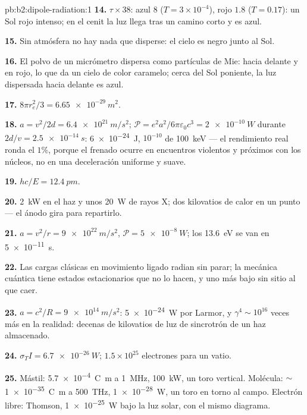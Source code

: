 \begin{solution}{pb:b2:dipole-radiation:1}
\textbf{14.} $\tau \times 38$: azul $8$ ($T = 3 \times 10^{-4}$), rojo $1.8$ ($T = 0.17$): un Sol
rojo intenso; en el cenit la luz llega tras un camino corto y es azul.

\textbf{15.} Sin atmósfera no hay nada que disperse: el cielo es negro junto
al Sol.

\textbf{16.} El polvo de un micrómetro dispersa como partículas de Mie: hacia delante y
en rojo, lo que da un cielo de color caramelo; cerca del Sol poniente, la
luz dispersada hacia delante es azul.

\textbf{17.} $8\pi r_e^2/3 = \qty{6.65e-29}{m^2}$.

\textbf{18.} $a = v^2/2d = \qty{6.4e21}{m/s^2}$; $\mathcal P = e^2a^2/6\pi\varepsilon_0c^3 =
\qty{2e-10}{W}$ durante $2d/v = \qty{2.5e-14}{s}$: \qty{6e-24}{J}, $10^{-10}$ de
\qty{100}{keV} --- el rendimiento real ronda el $1\%$, porque el frenado ocurre
en encuentros violentos y próximos con los núcleos, no en una deceleración
uniforme y suave.

\textbf{19.} $hc/E = \qty{12.4}{pm}$.

\textbf{20.} \qty{2}{kW} en el haz y unos \qty{20}{W} de rayos X; dos kilovatios
de calor en un punto --- el ánodo gira para repartirlo.

\textbf{21.} $a = v^2/r = \qty{9e22}{m/s^2}$, $\mathcal P = \qty{5e-8}{W}$; los \qty{13.6}{eV} se van
en \qty{5e-11}{s}.

\textbf{22.} Las cargas clásicas en movimiento ligado radian sin parar;
la mecánica cuántica tiene estados estacionarios que no lo hacen, y uno más bajo
sin sitio al que caer.

\textbf{23.} $a = c^2/R = \qty{9e14}{m/s^2}$: \qty{5e-24}{W} por Larmor, y $\gamma^4 \sim 10^{16}$
veces más en la realidad: decenas de kilovatios de luz de sincrotrón de un
haz almacenado.

\textbf{24.} $\sigma_TI = \qty{6.7e-26}{W}$; $1.5 \times 10^{25}$ electrones para un vatio.

\textbf{25.} Mástil: \qty{5.7e-4}{C.m} a \qty{1}{MHz}, \qty{100}{kW}, un toro
vertical. Molécula: $\sim$\qty{1e-35}{C.m} a \qty{500}{THz}, \qty{1e-28}{W},
un toro en torno al campo. Electrón libre: Thomson, \qty{1e-25}{W} bajo
la luz solar, con el mismo diagrama.
\end{solution}
